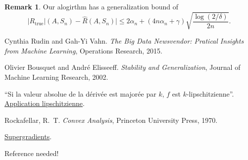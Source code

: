 \documentclass[11pt]{article}
\theoremstyle{plain}
\theoremstyle{definition}
\newtheorem*{rem}{Remark}
\begin{document}
\begin{rem}
  Our alogirthm has a generalization bound of
  \begin{equation}
    |R_{\text{true}}|(A,S_n) - \hat R(A,S_n)| \leq 2\alpha_n + (4n\alpha_n + \gamma) \sqrt{\frac{\log(2/\delta)}{2n}}.
  \end{equation}
\end{rem}

\begin{thebibliography}{99}

  Cynthia Rudin and Gah-Yi Vahn. \textit{The Big Data Newsvendor: Pratical Insights from
    Machine Learning}, Operations Research, 2015.

  Olivier Bousquet and André Elisseeff. \textit{Stability and Generalization}, Journal of
  Machine Learning Research, 2002.

  ``Si la valeur absolue de la dérivée est majorée par $k$, $f$ est $k$-lipschitzienne''.
  \href{https://fr.wikipedia.org/wiki/Application_lipschitzienne}{Application
    lipschitzienne}.

  Rockafellar, R.~T. \emph{Convex Analysis}, Princeton University Press, 1970.

  \href{http://people.hss.caltech.edu/~kcb/Notes/Supergrad.pdf}{Supergradients}.

 Reference needed!

\end{thebibliography}
\end{document}
